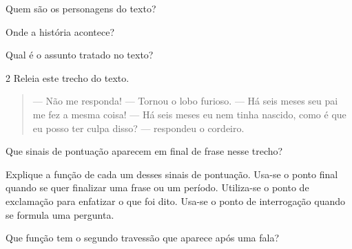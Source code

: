 \pagebreak
\begin{escolha}
\item Quem são os personagens do texto?



\item Onde a história acontece?



\item Qual é o assunto tratado no texto?

\end{escolha}

\num{2} Releia este trecho do texto.

\begin{quote}
--- Não me responda! --- Tornou o lobo furioso.
--- Há seis meses seu pai me fez a mesma coisa!
--- Há seis meses eu nem tinha nascido, como é que eu posso ter culpa disso? --- respondeu o cordeiro.
\end{quote}

\begin{escolha}
\item Que sinais de pontuação aparecem em final de frase nesse trecho?



\item Explique a função de cada um desses sinais de pontuação. Usa-se o
ponto final quando se quer finalizar uma frase ou um período. Utiliza-se
o ponto de exclamação para enfatizar o que foi dito. Usa-se o ponto de
interrogação quando se formula uma pergunta.


\item Que função tem o segundo travessão que aparece após uma fala?

\end{escolha}

